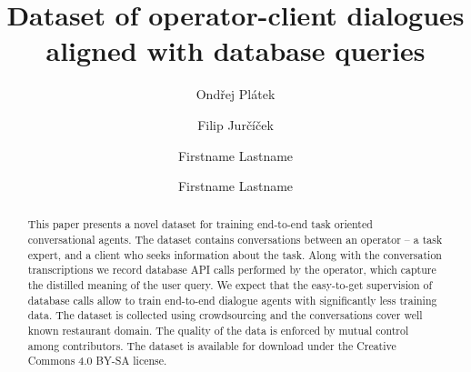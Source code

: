 \documentclass[runningheads,a4paper]{llncs}
\def\OP#1{#1}  %
\begin{document}


\title{Dataset of operator-client dialogues aligned with database queries}

\author{Ondřej Plátek \and Filip Jurčíček}

\iftrue %
\author{Firstname Lastname \and Firstname Lastname }
\fi
			
\maketitle

\begin{abstract}
    This paper presents a novel dataset for training end-to-end task oriented conversational agents.
    The dataset contains conversations between an operator – a task expert, and a client who seeks information about the task.
    Along with the conversation transcriptions we record database API calls performed by the operator, which capture the distilled meaning of the user query.
    We expect that the easy-to-get supervision of database calls allow to train end-to-end dialogue agents with significantly less training data.
 	The dataset is collected using crowdsourcing and the conversations cover well known restaurant domain.
    The quality of the data is enforced by mutual control among contributors.  %
    The dataset is available for download under the Creative Commons 4.0 BY-SA license.
\end{abstract}

\vspace{-1.00em}
\vspace{-1.00em}
\end{document}
